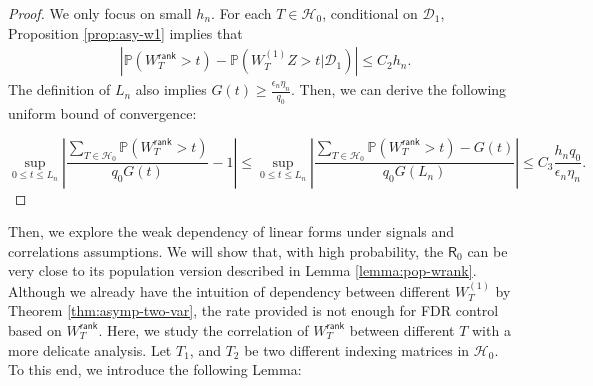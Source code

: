\documentclass[12pt]{article}
\newcommand{\abs}[1]{\left\lvert#1\right\rvert}
\newcommand{\PP}{\mathbb{P}}
\newcommand{\cH}{\mathcal{H}}
\newcommand{\cD}{\mathcal{D}}
\def\PP{{\mathbb P}}
\newcommand{\sfR}{{\mathsf{R}}}
\theoremstyle{plain}
\begin{document}
\begin{proof}
We only focus on small $h_n$. For each $T\in \cH_0$, conditional on  $\cD_1$, Proposition \ref{prop:asy-w1} implies that 
\begin{equation*}
    \begin{aligned}
    &\abs{\PP(W_T^\mathsf{rank}>t )-\PP( {W}^{(1)}_{T} Z > t |\cD_1 )} \le C_2 h_n.
    \end{aligned}
\end{equation*}
The definition of $L_n$ also implies $G(t)\ge \frac{\epsilon_n \eta_n}{q_0}$.
Then, we can derive the following uniform bound of convergence:

\begin{equation*}
    \sup\limits_{0\le t \le L_n} \abs{\frac{ \sum_{T\in\cH_0}\PP(W_T^\mathsf{rank}>t ) }{q_0 G(t) } -1 }\le \sup\limits_{0\le t \le L_n} \abs{\frac{ \sum_{T\in\cH_0}\PP(W_T^\mathsf{rank}>t )-G(t) }{q_0 G(L_n) } } \le C_3 \frac{h_n q_0}{\epsilon_n \eta_n }.
\end{equation*}
\end{proof}

Then, we explore the weak dependency of linear forms under signals and correlations assumptions. We will show that, with high probability, the $\sfR_0$ can be very close to its population version described in Lemma \ref{lemma:pop-wrank}. Although we already have the intuition of dependency between different $W_T^{(1)}$ by Theorem \ref{thm:asymp-two-var}, the rate provided is not enough for FDR control based on $W_T^{\mathsf{rank} }$. Here, we study the correlation of $W_T^{\mathsf{rank} }$ between different $T$ with a more delicate analysis. Let $T_1$, and $T_2$ be two different indexing matrices in $\cH_0$. To this end, we introduce the following Lemma:
\end{document}
